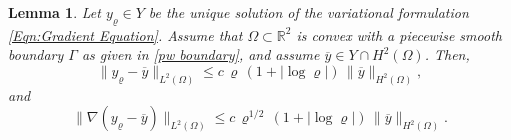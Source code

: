 \documentclass{article}
\newtheorem{lemma}{Lemma}
\numberwithin{equation}{section}
\begin{document}
\begin{lemma}\label{Lemma:Regularization error}
  Let $ y_\varrho \in Y$ be the unique solution of the variational formulation
  \eqref{Eqn:Gradient Equation}. Assume that $\Omega \subset {\mathbb{R}}^2$
  is convex with a piecewise smooth boundary $\Gamma$ as given in
  \eqref{pw boundary}, and assume $\overline{y} \in Y \cap H^2(\Omega)$. Then,
  \begin{equation}\label{Eqn:Regularization error pw 1}
    \| y_\varrho - \overline{y} \|_{L^2(\Omega)} \leq
    c \, \varrho \, (1 + |\log \varrho|) \, \| \overline{y} \|_{H^2(\Omega)},
  \end{equation}
  and
  \begin{equation}\label{Eqn:Regularization error pw 2}
    \| \nabla (y_\varrho - \overline{y}) \|_{L^2(\Omega)}
    \leq
    c \, \varrho^{1/2} \, (1+|\log \varrho|) \, \| \overline{y} \|_{H^2(\Omega)} .
  \end{equation}
\end{lemma}
\end{document}
